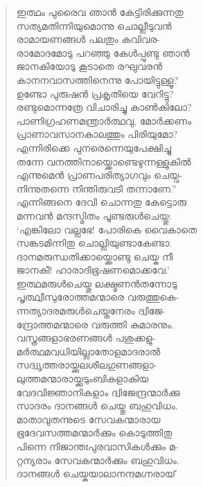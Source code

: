\begin{verse}
ഇത്ഥം പുരൈവ ഞാന്‍ കേട്ടിരിക്കുന്നതു\\
സത്യമതിന്നിയുമൊന്നു ചൊല്ലീടുവന്‍\\
രാമായണങ്ങള്‍ പലതും കവിവര-\\
രാമോദമോടു പറഞ്ഞു കേള്‍പ്പുണ്ടു ഞാന്‍\\
ജാനകിയോടു കൂടാതെ രഘുവരന്‍\\
കാനനവാസത്തിനെന്നു പോയിട്ടുള്ളൂ?\\
ഉണ്ടോ പുരുഷന്‍ പ്രകൃതിയെ വേറിട്ടു?\\
രണ്ടുമൊന്നത്രേ വിചാരിച്ചു കാണ്‍കിലോ?\\
പാണിഗ്രഹണമന്ത്രാര്‍ത്ഥവു, മോര്‍ക്കണം\\
പ്രാണാവസാനകാലത്തും പിരിയുമോ?\\
എന്നിരിക്കെ പുനരെന്നെയുപേക്ഷിച്ചു\\
തന്നേ വനത്തിനായ്ക്കൊണ്ടെഴുന്നള്ളുകില്‍\\
എന്നുമെന്‍ പ്രാണപരിത്യാഗവും ചെയ്വ-\\
നിന്നുതന്നെ നിന്തിരുവടി തന്നാണേ.”\\
എന്നിങ്ങനെ ദേവി ചൊന്നതു കേട്ടൊരു\\
മന്നവന്‍ മന്ദസ്മിതം പൂണ്ടരുള്‍ചെയ്തു:\\
‘എങ്കിലോ വല്ലഭേ! പോരികെ വൈകാതെ\\
സങ്കടമിന്നിതു ചൊല്ലിയുണ്ടാകേണ്ടാ.\\
ദാനമരുന്ധതിക്കായ്ക്കൊണ്ടു ചെയ്ക നീ\\
ജാനകീ! ഹാരാദിഭൂഷണമൊക്കവേ.’\\
ഇത്ഥമരുള്‍ചെയ്തു ലക്ഷ്മണന്‍തന്നോടു\\
പൃത്ഥ്വീസുരോത്തമന്മാരെ വരുത്തുകെ-\\
ന്നത്യാദരമരുള്‍ചെയ്തനേരം ദ്വിജേ-\\
ന്ദ്രോത്തമന്മാരെ വരുത്തി കുമാരനും.\\
വസ്ത്രങ്ങളാഭരണങ്ങള്‍ പശുക്കളു-\\
മര്‍ത്ഥമവധിയില്ലാതോളമാദരാല്‍\\
സദ്വൃത്തരായ്ക്കുലശീലഗുണങ്ങളാ-\\
ലുത്തമന്മാരായ്ക്കുടുംബികളാകിയ\\
വേദവിജ്ഞാനികളാം ദ്വിജേന്ദ്രന്മാര്‍ക്കു\\
സാദരം ദാനങ്ങള്‍ ചെയ്തു ബഹുവിധം.\\
മാതാവുതന്നുടെ സേവകന്മാരായ\\
ഭൂദേവസത്തമന്മാര്‍ക്കും കൊടുത്തിതു\\
പിന്നെ നിജാന്തഃപുരവാസികള്‍ക്കും മ-\\
റ്റന്യരാം സേവകന്മാര്‍ക്കും ബഹുവിധം.\\
ദാനങ്ങള്‍ ചെയ്കയാലാനന്ദമഗ്നരായ്\\

\end{verse}
